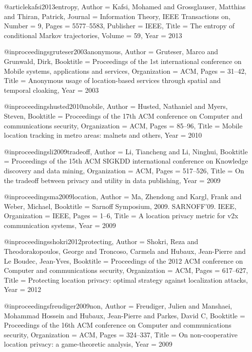 {{{{{	
	
	@article{kafsi2013entropy,
	Author = {Kafsi, Mohamed and Grossglauser, Matthias and Thiran, Patrick},
	Journal = {Information Theory, IEEE Transactions on},
	Number = {9},
	Pages = {5577--5583},
	Publisher = {IEEE},
	Title = {The entropy of conditional Markov trajectories},
	Volume = {59},
	Year = {2013}}
	
	@inproceedings{gruteser2003anonymous,
	Author = {Gruteser, Marco and Grunwald, Dirk},
	Booktitle = {Proceedings of the 1st international conference on Mobile systems, applications and services},
	Organization = {ACM},
	Pages = {31--42},
	Title = {Anonymous usage of location-based services through spatial and temporal cloaking},
	Year = {2003}}
	
	@inproceedings{husted2010mobile,
	Author = {Husted, Nathaniel and Myers, Steven},
	Booktitle = {Proceedings of the 17th ACM conference on Computer and communications security},
	Organization = {ACM},
	Pages = {85--96},
	Title = {Mobile location tracking in metro areas: malnets and others},
	Year = {2010}}
	
	@inproceedings{li2009tradeoff,
	Author = {Li, Tiancheng and Li, Ninghui},
	Booktitle = {Proceedings of the 15th ACM SIGKDD international conference on Knowledge discovery and data mining},
	Organization = {ACM},
	Pages = {517--526},
	Title = {On the tradeoff between privacy and utility in data publishing},
	Year = {2009}}
	
	@inproceedings{ma2009location,
	Author = {Ma, Zhendong and Kargl, Frank and Weber, Michael},
	Booktitle = {Sarnoff Symposium, 2009. SARNOFF'09. IEEE},
	Organization = {IEEE},
	Pages = {1--6},
	Title = {A location privacy metric for v2x communication systems},
	Year = {2009}}
	
	@inproceedings{shokri2012protecting,
	Author = {Shokri, Reza and Theodorakopoulos, George and Troncoso, Carmela and Hubaux, Jean-Pierre and Le Boudec, Jean-Yves},
	Booktitle = {Proceedings of the 2012 ACM conference on Computer and communications security},
	Organization = {ACM},
	Pages = {617--627},
	Title = {Protecting location privacy: optimal strategy against localization attacks},
	Year = {2012}}
	
	@inproceedings{freudiger2009non,
	Author = {Freudiger, Julien and Manshaei, Mohammad Hossein and Hubaux, Jean-Pierre and Parkes, David C},
	Booktitle = {Proceedings of the 16th ACM conference on Computer and communications security},
	Organization = {ACM},
	Pages = {324--337},
	Title = {On non-cooperative location privacy: a game-theoretic analysis},
	Year = {2009}}
	
}}}}}
